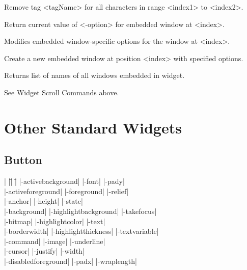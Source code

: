 \begin{enum}{1cm}
Remove tag <tagName> for all characters in range <index1> to <index2>.

Return current value of <-option> for embedded window at <index>.

Modifies embedded window-specific options for the window at <index>.

Create a new embedded window at position <index> with specified options.

Returns list of names of all windows embedded in widget.

See Widget Scroll Commands above.

\end{enum}


\section{Other Standard Widgets}

\subsection*{Button}
\vspace{-4pt}
\begin{tabbing}
|                   |\=|                     |\= \kill
|-activebackground| \> |-font|               \> |-pady| \\
|-activeforeground| \> |-foreground|         \> |-relief| \\
|-anchor|           \> |-height|             \> |-state| \\
|-background|       \> |-highlightbackground|\> |-takefocus| \\
|-bitmap|           \> |-highlightcolor|     \> |-text| \\        
|-borderwidth|      \> |-highlightthickness| \> |-textvariable| \\
|-command|          \> |-image|              \> |-underline| \\   
|-cursor|	    \> |-justify|            \> |-width| \\       
|-disabledforeground| \> |-padx| 	     \> |-wraplength| \\  
\end{tabbing}


